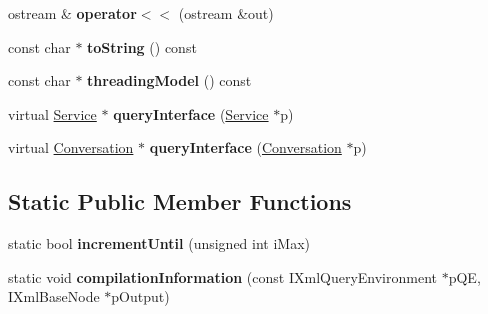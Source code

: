 \begin{DoxyCompactItemize}
\item 
\hypertarget{classgeneral__server_1_1Thread_a9a60e8d11239d1e3e497876e0b9b8ab7}{ostream \& {\bfseries operator$<$$<$} (ostream \&out)}\label{classgeneral__server_1_1Thread_a9a60e8d11239d1e3e497876e0b9b8ab7}

\item 
\hypertarget{classgeneral__server_1_1Thread_a5e632a89ea1bd58dda70b5e08d8183ca}{const char $\ast$ {\bfseries to\-String} () const }\label{classgeneral__server_1_1Thread_a5e632a89ea1bd58dda70b5e08d8183ca}

\item 
\hypertarget{classgeneral__server_1_1Thread_a0446316c1f864a4d33da94c9164d48ad}{const char $\ast$ {\bfseries threading\-Model} () const }\label{classgeneral__server_1_1Thread_a0446316c1f864a4d33da94c9164d48ad}

\item 
\hypertarget{classgeneral__server_1_1Thread_aed2bd33241c2adc0aeeb2ab0078bb712}{virtual \hyperlink{classgeneral__server_1_1Service}{\-Service} $\ast$ {\bfseries query\-Interface} (\hyperlink{classgeneral__server_1_1Service}{\-Service} $\ast$p)}\label{classgeneral__server_1_1Thread_aed2bd33241c2adc0aeeb2ab0078bb712}

\item 
\hypertarget{classgeneral__server_1_1Thread_a7055d109ae7e0b79f2b1513cd0514bd3}{virtual \hyperlink{classgeneral__server_1_1Conversation}{\-Conversation} $\ast$ {\bfseries query\-Interface} (\hyperlink{classgeneral__server_1_1Conversation}{\-Conversation} $\ast$p)}\label{classgeneral__server_1_1Thread_a7055d109ae7e0b79f2b1513cd0514bd3}

\end{DoxyCompactItemize}
\subsection*{\-Static \-Public \-Member \-Functions}
\begin{DoxyCompactItemize}
\item 
\hypertarget{classgeneral__server_1_1Thread_a43fd3b346633b09cb02098a27a163007}{static bool {\bfseries increment\-Until} (unsigned int i\-Max)}\label{classgeneral__server_1_1Thread_a43fd3b346633b09cb02098a27a163007}

\item 
\hypertarget{classgeneral__server_1_1Thread_a2cd8e341221f11a4fb010aab15fff082}{static void {\bfseries compilation\-Information} (const \-I\-Xml\-Query\-Environment $\ast$p\-Q\-E, \-I\-Xml\-Base\-Node $\ast$p\-Output)}\label{classgeneral__server_1_1Thread_a2cd8e341221f11a4fb010aab15fff082}

\end{DoxyCompactItemize}

